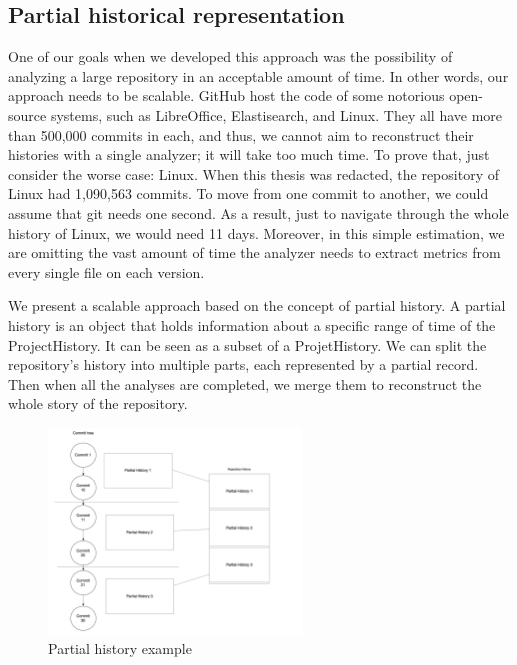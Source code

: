 \label{s:partialHistoricalRepr}
\subsection*{Partial historical representation}
One of our goals when we developed this approach was the possibility of analyzing a large repository in an acceptable amount of time. 
In other words, our approach needs to be scalable.
GitHub host the code of some notorious open-source systems, such as LibreOffice, Elastisearch, and Linux.
They all have more than 500,000 commits in each, and thus, we cannot aim to reconstruct their histories with a single analyzer; it will take too much time.  
To prove that, just consider the worse case: Linux. 
When this thesis was redacted, the repository of Linux had 1,090,563 commits. 
To move from one commit to another, we could assume that git needs one second. 
As a result, just to navigate through the whole history of Linux, we would need 11 days.
Moreover, in this simple estimation, we are omitting the vast amount of time the analyzer needs to extract metrics from every single file on each version. 

We present a scalable approach based on the concept of partial history.
A partial history is an object that holds information about a specific range of time of the ProjectHistory. 
It can be seen as a subset of a ProjetHistory. 
We can split the repository's history into multiple parts, each represented by a partial record. Then when all the analyses are completed, we merge them to reconstruct the whole story of the repository.


\begin{figure}
    \begin{center}
        \includegraphics[width=0.6\textwidth]{PartialHistory.png}
    \end{center}
    \caption{Partial history example}
    \label{fig:PartialHistory}
\end{figure}

